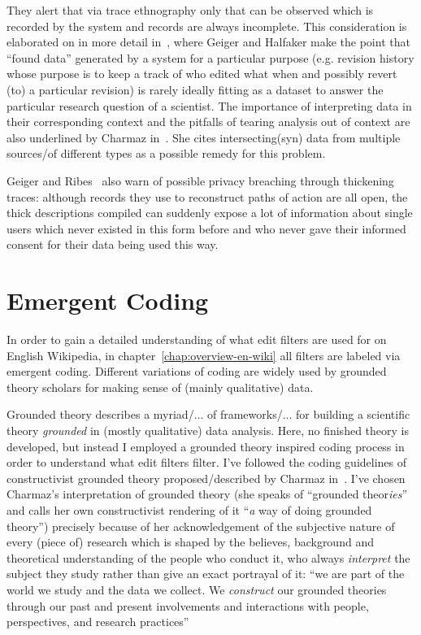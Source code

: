 They alert that via trace ethnography only that can be observed which is recorded by the system and records are always incomplete.
This consideration is elaborated on in more detail in~\cite{GeiHal2017}, where Geiger and Halfaker make the point that ``found data'' generated by a system for a particular purpose (e.g. revision history whose purpose is to keep a track of who edited what when and possibly revert (to) a particular revision) is rarely ideally fitting as a dataset to answer the particular research question of a scientist.
The importance of interpreting data in their corresponding context and the pitfalls of tearing analysis out of context are also underlined by Charmaz in~\cite{Charmaz2006}.
She cites intersecting(syn) data from multiple sources/of different types as a possible remedy for this problem. %

Geiger and Ribes~\cite{GeiRib2011} also warn of possible privacy breaching through thickening traces:
although records they use to reconstruct paths of action are all open, the thick descriptions compiled can suddenly expose a lot of information about single users which never existed in this form before and who never gave their informed consent for their data being used this way.


\section{Emergent Coding}
\label{sec:gt}

In order to gain a detailed understanding of what edit filters are used for on English Wikipedia, in chapter~\ref{chap:overview-en-wiki} all filters are labeled via emergent coding.
Different variations of coding are widely used by grounded theory scholars for making sense of (mainly qualitative) data.

Grounded theory describes a myriad/... of frameworks/... for building a scientific theory \emph{grounded} in (mostly qualitative) data analysis.
Here, no finished theory is developed, but instead I employed a grounded theory inspired coding process in order to understand what edit filters filter.
I've followed the coding guidelines of constructivist grounded theory proposed/described by Charmaz in~\cite[p.42-71]{Charmaz2006}.
I've chosen Charmaz's interpretation of grounded theory (she speaks of ``grounded theor\emph{ies}'' and calls her own constructivist rendering of it ``\emph{a} way of doing grounded theory'') precisely because of her acknowledgement of the subjective nature of every (piece of) research which is shaped by the believes, background and theoretical understanding of the people who conduct it, who always \emph{interpret} the subject they study rather than give an exact portrayal of it:
``we are part of the world we study and the data we collect. We \textit{construct} our grounded theories through our past and present involvements and interactions with people, perspectives, and research practices''~\cite[p.10]{Charmaz2006}

